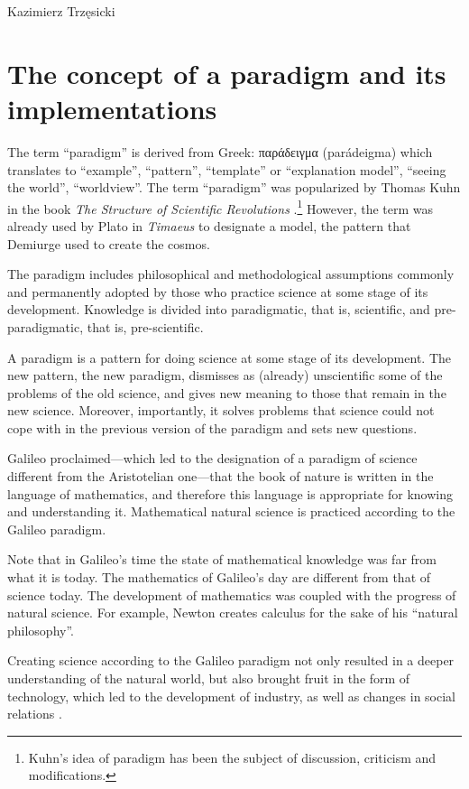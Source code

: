 \begin{artengenv}{Kazimierz Trzęsicki}
\section{The concept of a paradigm and its implementations} 
The term ``paradigm'' is derived from Greek: \foreignlanguage{greek}{παράδειγμα} (parádeigma) which translates to ``example'', ``pattern'', ``template'' or ``explanation model'', ``seeing the world'', ``worldview''. The term ``paradigm'' was popularized by Thomas Kuhn in the book \emph{The Structure of Scientific Revolutions} \parencite*{Kuhn1962,Kuhn1974}.\footnote{Kuhn's idea of paradigm has been the subject of discussion, criticism and modifications.}
 However, the term was already used by Plato in \emph{Timaeus} to designate a model, the pattern that Demiurge used to create the cosmos.


The paradigm includes philosophical and methodological assumptions commonly and permanently adopted by those who practice science at some stage of its development. Knowledge is divided into paradigmatic, that is, scientific, and pre-paradigmatic, that is, pre-scientific.

A paradigm is a pattern for doing science at some stage of its development. The new pattern, the new paradigm, dismisses as (already) unscientific some of the problems of the old science, and gives new meaning to those that remain in the new science. Moreover, importantly, it solves problems that science could not cope with in the previous version of the paradigm and sets new questions.

Galileo proclaimed---which led to the designation of a paradigm of science different from the Aristotelian one---that the book of nature is written in the language of mathematics, and therefore this language is appropriate for knowing and understanding it. Mathematical natural science is practiced according to the Galileo paradigm.

Note that in Galileo's time the state of mathematical knowledge was far from what it is today. The mathematics of Galileo's day are different from that of science today. The development of mathematics was coupled with the progress of natural science. For example, Newton creates calculus for the sake of his ``natural philosophy''.

Creating science according to the Galileo paradigm not only resulted in a deeper understanding of the natural world, but also brought fruit in the form of technology, which led to the development of industry, as well as changes in social relations \parencite[p.141--148]{MarciszewskiStacewicz2011}.



\end{artengenv}
